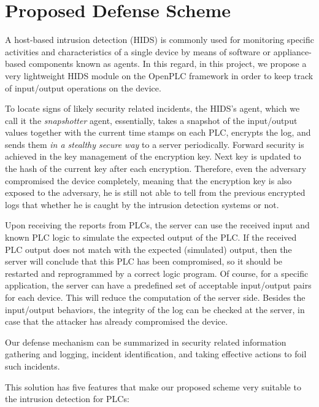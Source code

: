 \section{Proposed Defense Scheme}

A host-based intrusion detection (HIDS) is commonly used for monitoring specific activities and characteristics of a single device by means of software or appliance-based components known as agents. In this regard, in this project, we propose a very lightweight HIDS module on the OpenPLC framework in order to keep track of input/output operations on the device.

To locate signs of likely security related incidents, the HIDS's agent, which we call it the \emph{snapshotter} agent, essentially, takes a snapshot of the input/output values together with the current time stamps on each PLC, encrypts the log, and sends them \emph{in a stealthy secure way} to a server periodically. Forward security is achieved in the key management of the encryption key. Next key is updated to the hash of the current key after each encryption. Therefore, even the adversary compromised the device completely, meaning that the encryption key is also exposed to the adversary, he is still not able to tell from the previous encrypted logs that whether he is caught by the intrusion detection systems or not.   

Upon receiving the reports from PLCs, the server can use the received input and known PLC logic to simulate the expected output of the PLC. If the received PLC output does not match with the expected (simulated) output, then the server will conclude that this PLC has been compromised, so it should be restarted and reprogrammed by a correct logic program. Of course, for a specific application, the server can have a predefined set of acceptable input/output pairs for each device. This will reduce the computation of the server side. Besides the input/output behaviors, the integrity of the log can be checked at the server, in case that the attacker has already compromised the device.

Our defense mechanism can be summarized in security related information gathering and logging, incident identification, and taking effective actions to foil such incidents.

This solution has five features that make our proposed scheme very suitable to the intrusion detection for PLCs:

